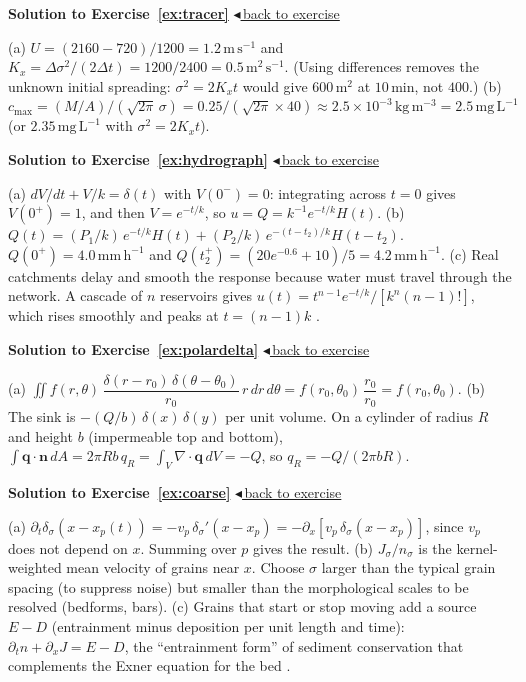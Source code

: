 \documentclass[11pt,letterpaper]{article}
\numberwithin{equation}{section}
\newcommand{\nn}{\mathbf{n}}
\newcommand{\qq}{\mathbf{q}}
\newcommand{\units}[1]{\,\mathrm{#1}}
\newenvironment{solution}[1]{%
  \par\addvspace{1.0ex}\noindent\phantomsection\label{sol:#1}%
  {\color{exorange!85!black}\bfseries Solution to Exercise~\ref{ex:#1}}%
  \hfill\hyperref[ex:#1]{\small$\blacktriangleleft$\,back to exercise}\par\nopagebreak\smallskip}%
  {\par\smallskip\noindent{\color{exorange!40}\rule{\linewidth}{0.4pt}}\par}
\begin{document}
\begin{solution}{tracer}
(a) $U=(2160-720)/1200=1.2\units{m\,s^{-1}}$ and $K_x=\Delta\sigma^2/(2\Delta t)=1200/2400=0.5\units{m^2\,s^{-1}}$. (Using differences removes the unknown initial
spreading: $\sigma^2=2K_xt$ would give $600\units{m^2}$ at $10\units{min}$, not $400$.)
(b) $c_{\max}=(M/A)/(\sqrt{2\pi}\,\sigma)=0.25/(\sqrt{2\pi}\times40)\approx2.5\times10^{-3}\units{kg\,m^{-3}}=2.5\units{mg\,L^{-1}}$ (or $2.35\units{mg\,L^{-1}}$ with
$\sigma^2=2K_xt$).
\end{solution}

\begin{solution}{hydrograph}
(a) $dV/dt+V/k=\delta(t)$ with $V(0^-)=0$: integrating across $t=0$ gives $V(0^+)=1$, and then $V=e^{-t/k}$, so $u=Q=k^{-1}e^{-t/k}H(t)$.
(b) $Q(t)=(P_1/k)\,e^{-t/k}H(t)+(P_2/k)\,e^{-(t-t_2)/k}H(t-t_2)$. $Q(0^+)=4.0\units{mm\,h^{-1}}$ and
$Q(t_2^+)=(20e^{-0.6}+10)/5=4.2\units{mm\,h^{-1}}$.
(c) Real catchments delay and smooth the response because water must travel through the network. A cascade of $n$ reservoirs gives
$u(t)=t^{n-1}e^{-t/k}/[k^n(n-1)!]$, which rises smoothly and peaks at $t=(n-1)k$ \citep{nash1957}.
\end{solution}

\begin{solution}{polardelta}
(a) $\iint f(r,\theta)\,\dfrac{\delta(r-r_0)\,\delta(\theta-\theta_0)}{r_0}\,r\,dr\,d\theta=f(r_0,\theta_0)\,\dfrac{r_0}{r_0}=f(r_0,\theta_0)$.
(b) The sink is $-(Q/b)\,\delta(x)\,\delta(y)$ per unit volume. On a cylinder of radius $R$ and height $b$ (impermeable top and bottom),
$\int\qq\cdot\nn\,dA=2\pi Rb\,q_R=\int_V\nabla\cdot\qq\,dV=-Q$, so $q_R=-Q/(2\pi bR)$.
\end{solution}

\begin{solution}{coarse}
(a) $\partial_t\delta_\sigma(x-x_p(t))=-v_p\,\delta_\sigma'(x-x_p)=-\partial_x[v_p\,\delta_\sigma(x-x_p)]$, since $v_p$ does not depend on $x$. Summing over $p$ gives the result.
(b) $J_\sigma/n_\sigma$ is the kernel-weighted mean velocity of grains near $x$. Choose $\sigma$ larger than the typical grain spacing (to suppress noise) but smaller
than the morphological scales to be resolved (bedforms, bars).
(c) Grains that start or stop moving add a source $E-D$ (entrainment minus deposition per unit length and time):
$\partial_tn+\partial_xJ=E-D$, the ``entrainment form'' of sediment conservation that complements the Exner equation for the bed \citep{furbish2012}.
\end{solution}
\end{document}
